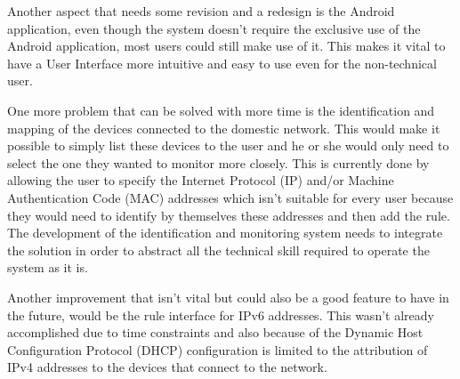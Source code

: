 Another aspect that needs some revision and a redesign is the Android
application, even though the system doesn't require the exclusive use of the
Android application, most users could still make use of it. This makes it vital
to have a User Interface more intuitive and easy to use even for the
non-technical user.

One more problem that can be solved with more time is the identification and
mapping of the devices connected to the domestic network. This would make it
possible to simply list these devices to the user and he or she would only need
to select the one they wanted to monitor more closely. This is currently done by
allowing the user to specify the Internet Protocol (IP) and/or Machine
Authentication Code (MAC) addresses which isn't suitable for every user because
they would need to identify by themselves these addresses and then add the rule.
The development of the identification and monitoring system needs to integrate
the solution in order to abstract all the technical skill required to operate
the system as it is.

Another improvement that isn't vital but could also be a good feature to have
in the future, would be the rule interface for IPv6 addresses. This wasn't
already accomplished due to time constraints and also because of the Dynamic
Host Configuration Protocol (DHCP) configuration is limited to the attribution
of IPv4 addresses to the devices that connect to the network.



